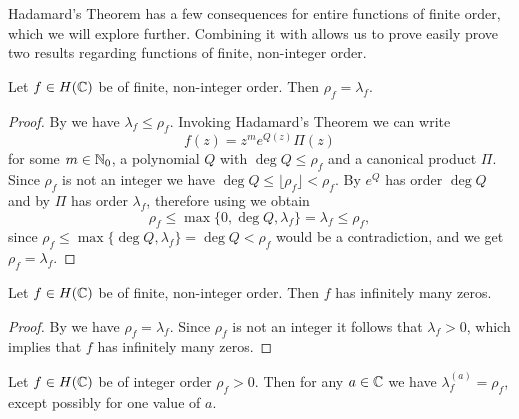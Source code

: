 Hadamard's Theorem has a few consequences for entire functions of finite order, which we will explore further. Combining it with  allows us to prove easily prove two results regarding functions of finite, non-integer order.

\begin{theorem} \label{thm:finite-non-integer-order-equals-exponent-of-convergence}
    Let $f \in H(\mathbb{C})$ be of finite, non-integer order. Then $\rho_f = \lambda_f$.
\end{theorem}

\begin{proof}
    By  we have $\lambda_f \leq \rho_f$. Invoking Hadamard's Theorem we can write
    $$ f(z) = z^m e^{Q(z)} \Pi(z) $$
    for some $m \in \mathbb{N}_0$, a polynomial $Q$ with $\deg Q \leq \rho_f$ and a canonical product $\Pi$. Since $\rho_f$ is not an integer we have $\deg Q \leq \lfloor \rho_f \rfloor < \rho_f$. By  $e^Q$ has order $\deg Q$ and by  $\Pi$ has order $\lambda_f$, therefore using  we obtain
    $$ \rho_f \leq \max \{ 0, \deg Q, \lambda_f \} = \lambda_f \leq \rho_f, $$
    since $\rho_f \leq \max \{ \deg Q, \lambda_f \} = \deg Q < \rho_f$ would be a contradiction, and we get $\rho_f = \lambda_f$.
\end{proof}

\begin{theorem} \label{thm:finite-non-integer-order-infinite-zeros}
    Let $f \in H(\mathbb{C})$ be of finite, non-integer order. Then $f$ has infinitely many zeros.
\end{theorem}

\begin{proof}
    By  we have $\rho_f = \lambda_f$. Since $\rho_f$ is not an integer it follows that $\lambda_f > 0$, which implies that $f$ has infinitely many zeros.
\end{proof}

\begin{theorem}[Borel] \label{thm:existence-borel-exceptional-values}
    Let $f \in H(\mathbb{C})$ be of integer order $\rho_f > 0$. Then for any $a \in \mathbb{C}$ we have $\lambda_f^{(a)} = \rho_f$, except possibly for one value of $a$.
\end{theorem}


